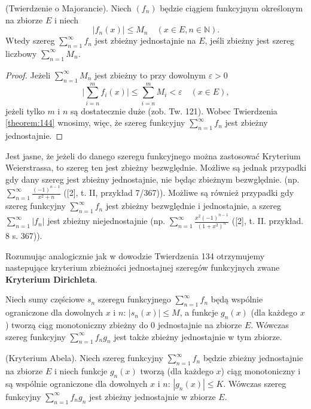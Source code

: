 \documentclass[leqno]{article}
\begin{document}
\begin{justify}
\begin{theorem}
{
    (Twierdzenie o Majorancie). Niech $(f_n)$ będzie ciągiem funkcyjnym określonym na zbiorze $E$ i niech
    \[
        |f_n(x)| \leqslant M_n \quad (x \in E, n \in \mathbb{N}).
    \]
    Wtedy szereg $\sum\limits_{n=1}^{\infty}f_n$ jest zbieżny jednostajnie na $E$, jeśli zbieżny jest 
    szereg liczbowy $\sum\limits_{n=1}^{\infty}M_n$.
}
\end{theorem}

\begin{proof}
    Jeżeli $\sum\limits_{n=1}^{\infty}M_n$ jest zbieżny to przy dowolnym $\varepsilon > 0$
    \[
        \Bigg|\sum\limits_{i=n}^{m}f_i(x)\Bigg| \leqslant \sum\limits_{i=n}^{m}M_i < \varepsilon \quad (x \in E),
    \]
    jeżeli tylko $m$ i $n$ są dostatecznie duże (zob. Tw. 121). Wobec Twierdzenia \ref{theorem:144} wnosimy, 
    więc, że szereg funkcyjny $\sum\limits_{n=1}^{\infty}f_n$ jest zbieżny jednostajnie.
\end{proof}

\begin{uwaga}
    Jest jasne, że jeżeli do danego szeregu funkcyjnego można zastosować Kryterium Weierstrassa, to szereg ten
    jest zbieżny bezwględnie. Możliwe są jednak przypadki gdy dany szereg jest zbieżny jednostajnie, nie będąc zbieżnym bezwględnie.
    (np. $\sum\limits_{n=1}^{\infty}\frac{(-1)^{n-1}}{x^2+n}$ ([2], t. II, przykład 7/367)). Możliwe są również przypadki gdy szereg
    funkcyjny $\sum\limits_{n=1}^{\infty}f_n$ jest zbieżny bezwględnie i jednostajnie, a szereg $\sum\limits_{n=1}^{\infty}|f_n|$ jest zbieżny
    niejednostajnie (np. $\sum\limits_{n=1}^{\infty}\frac{x^2(-1)^{n-1}}{{(1+x^2)}^n}$ ([2], t. II. przykład. 8 s. 367)).
\end{uwaga}

Rozumując analogicznie jak w dowodzie Twierdzenia 134 otrzymujemy nastepujące kryterium zbieżności jednostajnej szeregów funkcyjnych zwane
\textbf{Kryterium Dirichleta}.

\begin{theorem}
{
    Niech sumy częściowe $s_n$ szeregu funkcyjnego $\sum\limits_{n=1}^{\infty}f_n$ będą wspólnie ograniczone dla dowolnych $x$ i $n$: 
    $|s_n(x)| \leqslant M$, a funkcje $g_n(x)$ (dla każdego $x$) tworzą ciąg monotoniczny zbieżny do $0$ jednostajnie na zbiorze $E$.
    Wówczas szereg funkcyjny $\sum\limits_{n=1}^{\infty}f_n g_n$ jest także zbieżny jednostajnie w tym zbiorze.
}
\end{theorem}

\begin{theorem}
{
    (Kryterium Abela). Niech szereg funkcyjny $\sum\limits_{n=1}^{\infty}f_n$
    będzie zbieżny jednostajnie na zbiorze $E$ i niech funkcje $g_n(x)$ tworzą (dla każdego $x$) ciąg monotoniczny
    i są wspólnie ograniczone dla dowolnych $x$ i $n$: $|g_n(x)| \leqslant K$. Wówczas szereg
    funkcyjny $\sum\limits_{n=1}^{\infty} f_n g_n$ jest zbieżny jednostajnie w zbiorze $E$.
}
\end{theorem}


\end{justify}
\end{document}
